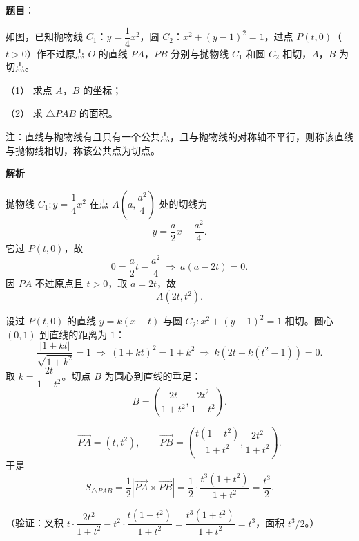 \begin{answer}

\textbf{题目}：

如图，已知抛物线 \(C_1\)：\(y=\dfrac{1}{4}x^2\)，圆 \(C_2\)：\(x^2+(y-1)^2=1\)，过点 \(P(t,0)\)（\(t>0\)）作不过原点 \(O\) 的直线 \(PA\)，\(PB\) 分别与抛物线 \(C_1\) 和圆 \(C_2\) 相切，\(A\)，\(B\) 为切点。

（1） 求点 \(A\)，\(B\) 的坐标；

（2） 求 \(\triangle PAB\) 的面积。

注：直线与抛物线有且只有一个公共点，且与抛物线的对称轴不平行，则称该直线与抛物线相切，称该公共点为切点。
\nopagebreak[4]
\begin{center}\end{center}
\nopagebreak[4]
\textbf{解析}


抛物线 \(C_1:y=\dfrac14x^2\) 在点 \(A\left(a,\dfrac{a^2}{4}\right)\) 处的切线为
\nopagebreak[4]
\[
y=\frac{a}2x-\frac{a^2}{4}.
\]
它过 \(P(t,0)\)，故
\nopagebreak[4]
\[
0=\frac{a}2t-\frac{a^2}{4}
\ \Longrightarrow\ a(a-2t)=0.
\]
因 \(PA\) 不过原点且 \(t>0\)，取 \(a=2t\)，故
\nopagebreak[4]
\[
A(2t,t^2).
\]

设过 \(P(t,0)\) 的直线 \(y=k(x-t)\) 与圆 \(C_2:x^2+(y-1)^2=1\) 相切。圆心 \((0,1)\) 到直线的距离为 \(1\)：
\nopagebreak[4]
\[
\frac{|1+kt|}{\sqrt{1+k^2}}=1
\ \Longrightarrow\ (1+kt)^2=1+k^2
\ \Longrightarrow\ k\left(2t+k(t^2-1)\right)=0.
\]
取 \(k=\dfrac{2t}{1-t^2}\)。切点 \(B\) 为圆心到直线的垂足：
\nopagebreak[4]
\[
B=\left(\frac{2t}{1+t^2},\frac{2t^2}{1+t^2}\right).
\]


\nopagebreak[4]
\[
\overrightarrow{PA}=(t,t^2),\qquad
\overrightarrow{PB}=\left(\frac{t(1-t^2)}{1+t^2},\frac{2t^2}{1+t^2}\right).
\]
于是
\nopagebreak[4]
\[
S_{\triangle PAB}
=\frac12\left|\overrightarrow{PA}\times\overrightarrow{PB}\right|
=\frac12\cdot\frac{t^3(1+t^2)}{1+t^2}
=\frac{t^3}{2}.
\]

（验证：叉积 \(t\cdot\dfrac{2t^2}{1+t^2}-t^2\cdot\dfrac{t(1-t^2)}{1+t^2}=\dfrac{t^3(1+t^2)}{1+t^2}=t^3\)，面积 \(t^3/2\)。）



\end{answer}
